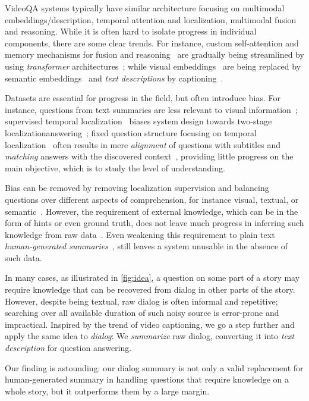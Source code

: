 \documentclass[10pt,twocolumn,letterpaper]{article}
\begin{document}
VideoQA systems typically have similar architecture focusing on multimodal embeddings/description, temporal attention and localization, multimodal fusion and reasoning. While it is often hard to isolate progress in individual components, there are some clear trends. For instance, custom self-attention and memory mechanisms for fusion and reasoning~\cite{Na_2017_ICCV,KCKZ18,FZZ+19} are gradually being streamlined by using \emph{transformer} architectures~\cite{UMDS20,Kim_2020_CVPR,YGC+20}; while visual embeddings~\cite{TZS+16} are being replaced by semantic embeddings~\cite{lei2018tvqa} and \emph{text descriptions} by captioning~\cite{kim2020dense,Chadha2020iPerceive}.

Datasets are essential for progress in the field, but often introduce bias. For instance, questions from text summaries are less relevant to visual information~\cite{TZS+16}; supervised temporal localization~\cite{lei2018tvqa} biases system design towards two-stage localizationanswering~\cite{lei2019tvqa+,Kim_2020_CVPR}; fixed question structure focusing on temporal localization~\cite{lei2018tvqa} often results in mere \emph{alignment} of questions with subtitles and \emph{matching} answers with the discovered context~\cite{kim2020dense}, providing little progress on the main objective, which is to study the level of understanding.

Bias can be removed by removing localization supervision and balancing questions over different aspects of comprehension, for instance visual, textual, or semantic~\cite{garcia2020knowit}. However, the requirement of external knowledge, which can be in the form of hints or even ground truth, does not leave much progress in inferring such knowledge from raw data~\cite{garcia2020knowit}. Even weakening this requirement to plain text \emph{human-generated summaries}~\cite{garcia2020knowledge}, still leaves a system unusable in the absence of such data.

In many cases, as illustrated in \autoref{fig:idea}, a question on some part of a story may require knowledge that can be recovered from dialog in other parts of the story. However, despite being textual, raw dialog is often informal and repetitive; searching over all available duration of such noisy source is error-prone and impractical. Inspired by the trend of video captioning, we go a step further and apply the same idea to \emph{dialog}: We \emph{summarize} raw dialog, converting it into \emph{text description} for question answering.

Our finding is astounding: our dialog summary is not only a valid replacement for human-generated summary in handling questions that require knowledge on a whole story, but it outperforms them by a large margin.
\end{document}
